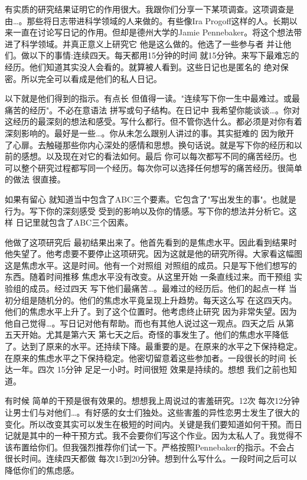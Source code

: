有实质的研究结果证明它的作用很大。我跟你们分享一下某项调查。这项调查是由…。那些将日志带进科学领域的人来做的。有些像Ira Progoff这样的人。长期以来一直在讨论写日记的作用。但却是德州大学的Jamie Pennebaker。将这个想法带进了科学领域。并真正意义上研究它 他是这么做的。他选了一些参与者 并让他们。做以下的事情:连续四天。每天都用15分钟的时间 就15分钟。来写下最难忘的经历。他们知道其实没人会看的。就算被人看到。这些日记也是匿名的 绝对保密。所以完全可以看成是他们的私人日记。 

以下就是他们得到的指示。有点长 但值得一读。"连续写下你一生中最难过。或最痛苦的经历"。不必在意语法 拼写或句子结构。在日记中 我希望你能谈谈…。你对这经历的最深刻的想法和感受。写什么都行。但不管你选什么。都必须是对你有着深刻影响的。最好是一些…。你从未怎么跟别人讲过的事。其实挺难的 因为敞开了心扉。去触碰那些你内心深处的感情和思想。换句话说。就是写下你的经历和以前的感想。以及现在对它的看法如何。最后 你可以每次都写不同的痛苦经历。也可以整个研究过程都写同一个经历。每次你可以选择任何想写的痛苦经历。很简单的做法 很直接。 

如果有留心 就知道当中包含了ABC三个要素。它包含了"写出发生的事"。也就是行为。写下你的深刻感受 受到的影响以及你的情感。写下你的想法并分析它。这样 日记里就包含了ABC三个因素。 

他做了这项研究后 最初结果出来了。他首先看到的是焦虑水平。因此看到结果时 他失望了。他考虑要不要停止这项研究。因为这就是他的研究所得。大家看这幅图 这是焦虑水平。这是时间。他有一个对照组 对照组的成员。只是写下他们想写的东西。随着时间推移 焦虑水平没有改变。从这里开始 一条直线过来。而干预组 实验组的成员。经过四天 写下他们最痛苦…。最难过的经历后。他们的起点一样 当初分组是随机分的。他们的焦虑水平竟呈现上升趋势。每天这么写 在这四天内。他们的焦虑水平上升了。到了这个位置时。他考虑终止研究 因为非常失望。因为他自己觉得…。写日记对他有帮助。而也有其他人说过这一观点。四天之后 从第五天开始。尤其是第六天 第七天之后。奇怪的事发生了。他们的焦虑水平降低了。达到了原来的水平。还持续下降。最重要的是。在原来的水平之下保持稳定。在原来的焦虑水平之下保持稳定。他密切留意着这些参加者。一段很长的时间 长达一年。四次 15分钟 足足一小时。时间很短 效果是持续的。想想 我们之前也知道。 

有时候 简单的干预是很有效果的。想想我上周说过的害羞研究。12次 每次12分钟 让男士们与对他们…。有好感的女士们独处。这些害羞的异性恋男士发生了很大的变化。所以改变其实可以发生在极短的时间内。关键是我们要知道如何干预。而日记就是其中的一种干预方式。我不会要你们写这个作业。因为太私人了。我觉得不该布置给你们。但我强烈推荐你们试一下。严格按照Pennebaker的指示。不会占很长时间。连续四天都做 每次15到20分钟。想到什么写什么。一段时间之后可以降低你们的焦虑感。 

